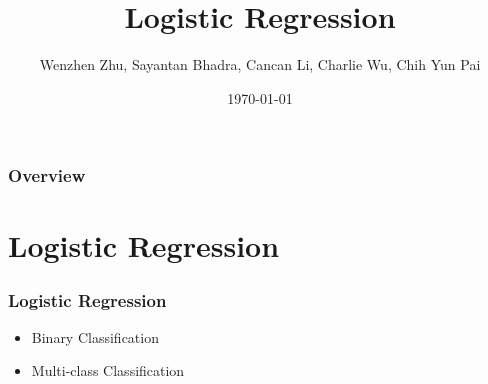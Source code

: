 \documentclass{beamer}
\title[Logistic Regression]{Logistic Regression} %
\author{Wenzhen Zhu, Sayantan Bhadra, Cancan Li, Charlie Wu, Chih Yun Pai} %
\institute[WUSTL] %
{
Washington University in St. Louis \\ %
\medskip
\textit{@wustl.edu} %
}
\date{\today} %
\begin{document}
\begin{frame}
\titlepage %
\end{frame}

\begin{frame}
\frametitle{Overview} %
\tableofcontents %
\end{frame}
\section{Logistic Regression} 
\begin{frame}
\frametitle{Logistic Regression}
\begin{itemize}
\item Binary Classification
\item Multi-class Classification
\end{itemize}
\end{frame}

\end{document}
